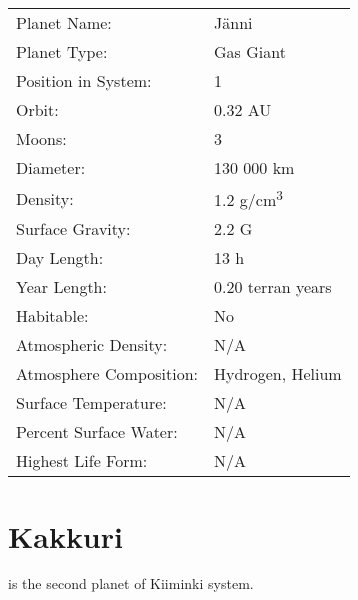 \documentclass{tufte-book}
\begin{document}
\bigskip
\begin{minipage}{\textwidth}
\begin{center}
\begin{tabular}{ll}
\toprule
Planet Name: & J\"{a}nni \\
Planet Type: & Gas Giant \\
Position in System: & 1 \\
Orbit: & 0.32 AU \\
Moons: & 3 \\
Diameter: & 130 000 km \\
Density: & 1.2 g/cm\textsuperscript{3} \\
Surface Gravity: & 2.2 G \\
Day Length: & 13 h \\
Year Length: & 0.20 terran years \\
Habitable: & No \\
\quad Atmospheric Density: & N/A \\
\quad Atmosphere Composition: & Hydrogen, Helium \\
\quad Surface Temperature: & N/A \\
\quad Percent Surface Water: & N/A \\
\quad Highest Life Form: & N/A \\

\bottomrule
\end{tabular}
\end{center}
\end{minipage}

\section{Kakkuri}

 is the second planet of Kiiminki system.
\end{document}
